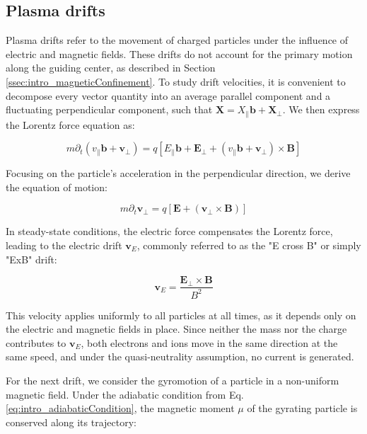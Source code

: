 \subsection{Plasma drifts}
\label{ssec:intro_plasmaDrifts}

Plasma drifts refer to the movement of charged particles under the influence of electric and magnetic fields. These drifts do not account for the primary motion along the guiding center, as described in Section \ref{ssec:intro_magneticConfinement}. To study drift velocities, it is convenient to decompose every vector quantity into an average parallel component and a fluctuating perpendicular component, such that $\mathbf{X} = X_\parallel\mathbf{b} + \mathbf{X_\perp}$. We then express the Lorentz force equation as:

\begin{equation}
	\label{eq:edge_LorentzEquationDecomposition}
	m\partial_t\left(v_\parallel\mathbf{b} + \mathbf{v}_\perp\right) = q\left[E_\parallel\mathbf{b} + \mathbf{E}_\perp + \left(v_\parallel\mathbf{b} + \mathbf{v}_\perp\right) \times \mathbf{B}\right]
\end{equation}

Focusing on the particle's acceleration in the perpendicular direction, we derive the equation of motion:

\begin{equation}
	\label{eq:edge_EcrossBdrift}
	m\partial_t \mathbf{v}_\perp = q\left[\mathbf{E} + \left(\mathbf{v}_\perp \times \mathbf{B}\right)\right]
\end{equation}

In steady-state conditions, the electric force compensates the Lorentz force, leading to the electric drift $\mathbf{v}_E$, commonly referred to as the "E cross B" or simply "ExB" drift:

\begin{equation}
	\mathbf{v}_E = \frac{\mathbf{E}_\perp \times \mathbf{B}}{B^2}
\end{equation}

This velocity applies uniformly to all particles at all times, as it depends only on the electric and magnetic fields in place. Since neither the mass nor the charge contributes to $\mathbf{v}_E$, both electrons and ions move in the same direction at the same speed, and under the quasi-neutrality assumption, no current is generated.

For the next drift, we consider the gyromotion of a particle in a non-uniform magnetic field. Under the adiabatic condition from Eq. \ref{eq:intro_adiabaticCondition}, the magnetic moment $\mu$ of the gyrating particle is conserved along its trajectory:

